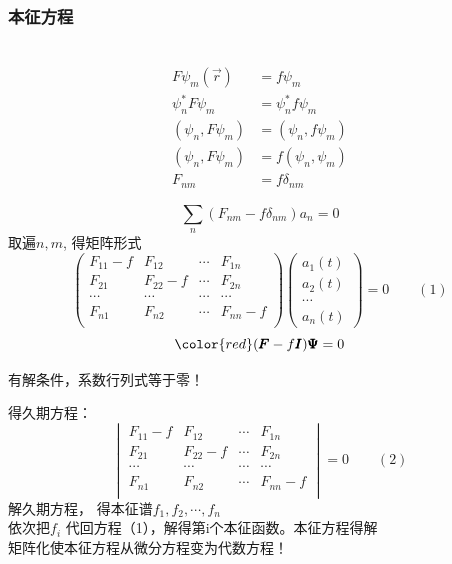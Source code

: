 \begin{frame} 
    \frametitle{本征方程}
    \解~ 
    \begin{equation*}
        \begin{split}
            F\psi_m (\vec{r}) &=f \psi_m \\
            \psi_n ^*  F\psi_m &=\psi_n ^* f \psi_m\\
            (\psi_n, F\psi_m )&=(\psi_n, f \psi_m)\\
            (\psi_n, F\psi_m )&=f(\psi_n, \psi_m)\\
            F_{nm} &=f \delta_{nm}
        \end{split} 
    \end{equation*}
\end{frame}

\begin{frame} 
    $$ \sum_n (F_{nm} -f \delta_{nm})a_n=0 $$
    取遍$n,m$, 得矩阵形式\\            
    $$\begin{pmatrix}
        F_{11}-f & F_{12} & \cdots & F_{1n} \\
        F_{21} & F_{22}-f & \cdots & F_{2n} \\
        \cdots & \cdots &  \cdots& \cdots\\
         F_{n1} & F_{n2} & \cdots & F_{nn}-f \\
     \end{pmatrix}
     \begin{pmatrix}
         a_1(t)\\
         a_2(t)\\
         \cdots \\
         a_n(t)
     \end{pmatrix}
     =0 \qquad (1)$$
     $$ \color{red} (\pmb F -f \pmb I) \pmb \Psi =0 $$

    有解条件，系数行列式等于零！
\end{frame}

\begin{frame} 
    得久期方程：
    $$\begin{vmatrix}
        F_{11}-f & F_{12} & \cdots & F_{1n} \\
        F_{21} & F_{22}-f & \cdots & F_{2n} \\
        \cdots & \cdots &  \cdots& \cdots\\
         F_{n1} & F_{n2} & \cdots & F_{nn}-f \\
     \end{vmatrix} 
     =0 \qquad (2) $$
     解久期方程， 得本征谱{$f_1,f_2,\cdots, f_n $}\\
     依次把$f_i$ 代回方程（1），解得第i个本征函数。本征方程得解\\
     矩阵化使本征方程从微分方程变为代数方程！
\end{frame}

